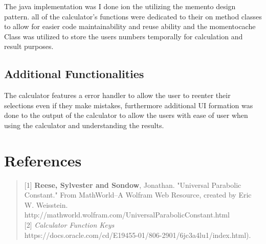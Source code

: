 \documentclass[12pt]{report}
\begin{document}
The java implementation was I done ion the utilizing the memento design pattern. all of the calculator's functions were dedicated to their on method classes to allow for easier code maintainability and reuse ability and the momentocache Class was utilized to store the users numbers temporally for calculation and result purposes.  


\section{Additional Functionalities}

The calculator features a error handler to allow the user to reenter their selections even if they make mistakes, furthermore additional UI formation was done to the output of the calculator to allow the users with ease of user when using the calculator and understanding the results. 


\chapter{References}
\begin{quote}
    

[1] \textbf{Reese, Sylvester and Sondow}, Jonathan. "Universal Parabolic Constant." From MathWorld--A Wolfram Web Resource, created by Eric W. Weisstein.\\ http://mathworld.wolfram.com/UniversalParabolicConstant.html\\

[2] {\it Calculator Function Keys\/}\\
https://docs.oracle.com/cd/E19455-01/806-2901/6jc3a4lu1/index.html).




\end{quote}
\end{document}
